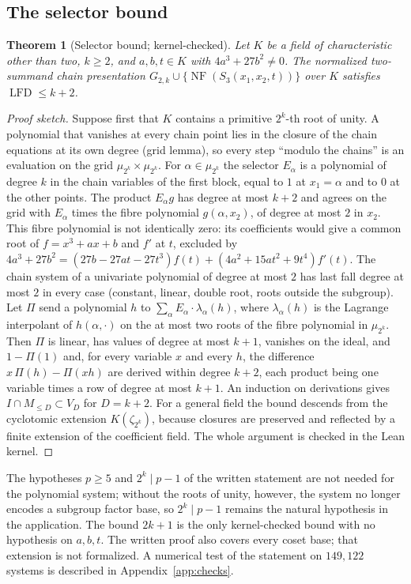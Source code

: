 \documentclass[11pt]{article}
\newtheorem{theorem}{Theorem}
\theoremstyle{definition}\newtheorem{definition}[theorem]{Definition}
\theoremstyle{remark}\newtheorem{remark}[theorem]{Remark}
\newcommand{\lfd}{\operatorname{LFD}}
\newcommand{\NF}{\operatorname{NF}}
\begin{document}
\subsection{The selector bound}\label{sec:selector}
\begin{theorem}[Selector bound; kernel-checked]\label{thm:selector}
Let $K$ be a field of characteristic other than two, $k\ge2$, and
$a,b,t\in K$ with $4a^3+27b^2\ne0$. The normalized two-summand chain
presentation $G_{2,k}\cup\{\NF(S_3(x_1,x_2,t))\}$ over $K$ satisfies
$\lfd\le k+2$.
\end{theorem}
\begin{proof}[Proof sketch]
Suppose first that $K$ contains a primitive $2^k$-th root of unity. A
polynomial that vanishes at every chain point lies in the closure of the
chain equations at its own degree (grid lemma), so every step ``modulo the
chains'' is an evaluation on the grid $\mu_{2^k}\times\mu_{2^k}$. For
$\alpha\in\mu_{2^k}$ the selector $E_\alpha$ is a polynomial of degree $k$ in
the chain variables of the first block, equal to $1$ at $x_1=\alpha$ and to
$0$ at the other points. The product $E_\alpha g$ has degree at most $k+2$
and agrees on the grid with $E_\alpha$ times the fibre polynomial
$g(\alpha,x_2)$, of degree at most $2$ in $x_2$. This fibre polynomial is
not identically zero: its coefficients would give a common root of
$f=x^3+ax+b$ and $f'$ at $t$, excluded by
$4a^3+27b^2=(27b-27at-27t^3)f(t)+(4a^2+15at^2+9t^4)f'(t)$. The chain system of a
univariate polynomial of degree at most $2$ has last fall degree at most
$2$ in every case (constant, linear, double root, roots outside the
subgroup). Let $\Pi$ send a polynomial $h$ to
$\sum_\alpha E_\alpha\cdot\lambda_\alpha(h)$, where $\lambda_\alpha(h)$ is
the Lagrange interpolant of $h(\alpha,\cdot)$ on the at most two roots of
the fibre polynomial in $\mu_{2^k}$. Then $\Pi$ is linear, has values of
degree at most $k+1$, vanishes on the ideal, and $1-\Pi(1)$ and, for every variable $x$ and
every $h$, the difference $x\,\Pi(h)-\Pi(xh)$ are derived within degree $k+2$,
each product being one variable times a row of degree at most $k+1$. An
induction on derivations gives $I\cap M_{\le D}\subset V_D$ for $D=k+2$.
For a general field the bound descends from the cyclotomic extension
$K(\zeta_{2^k})$, because closures are preserved and reflected by a finite
extension of the coefficient field. The whole argument is checked in the
Lean kernel.
\end{proof}

The hypotheses $p\ge5$ and $2^k\mid p-1$ of the written statement are not
needed for the polynomial system; without the roots of unity, however, the
system no longer encodes a subgroup factor base, so $2^k\mid p-1$ remains
the natural hypothesis in the application. The bound $2k+1$ is the only
kernel-checked bound with no hypothesis on $a,b,t$. The written proof also
covers every coset base; that extension is not formalized. A numerical test
of the statement on $149{,}122$ systems is described in
Appendix~\ref{app:checks}.
\end{document}
